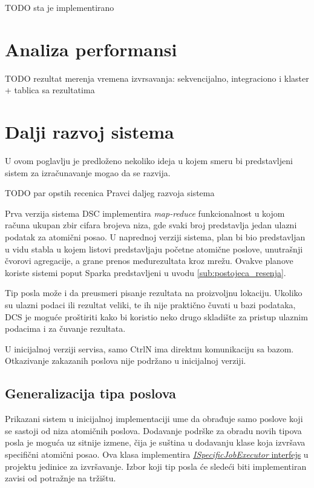 \documentclass[12pt,oneside]{memoir}
\begin{document}
TODO sta je implementirano




\section{Analiza performansi}
TODO rezultat merenja vremena izvrsavanja: sekvencijalno, integraciono i klaster
+ tablica sa rezultatima

\section{Dalji razvoj sistema}

U ovom poglavlju je predloženo nekoliko ideja u kojem smeru bi predstavljeni sistem za izračunavanje mogao da se razvija.

TODO par opstih recenica Pravci daljeg razvoja sistema

Prva verzija sistema DSC implementira \emph{map-reduce} funkcionalnost u kojom računa ukupan zbir cifara brojeva niza, gde svaki broj predstavlja jedan ulazni podatak za atomični posao. U naprednoj verziji sistema, plan bi bio predstavljan u vidu stabla u kojem listovi predstavljaju početne atomične poslove, unutrašnji čvorovi agregacije, a grane prenos međurezultata kroz mrežu. Ovakve planove koriste sistemi poput Sparka \cite{Spark} predstavljeni u uvodu \ref{sub:postojeca_resenja}.

Tip posla može i da preusmeri pisanje rezultata na proizvoljnu lokaciju.
Ukoliko su ulazni podaci ili rezultat veliki, te ih nije praktično čuvati u bazi podataka, DCS je moguće proštiriti kako bi koristio neko drugo skladište za pristup ulaznim podacima i za čuvanje rezultata.

U inicijalnoj verziji servisa, samo CtrlN ima direktnu komunikaciju sa bazom.
Otkazivanje zakazanih poslova nije podržano u inicijalnoj verziji.

\subsection{Generalizacija tipa poslova}

Prikazani sistem u inicijalnoj implementaciji ume da obrađuje samo poslove koji se sastoji od niza atomičnih poslova. Dodavanje podrške za obradu novih tipova posla je moguća uz sitnije izmene, čija je suština u dodavanju klase koja izvršava specifični atomični posao. Ova klasa implementira \href{https://github.com/milana-kovacevic/DistributedComputationSystem/blob/main/src/ComputeNode/Executors/ISpecificJobExecutor.cs}{\emph{ISpecificJobExecutor} interfejs} u projektu jedinice za izvršavanje. Izbor koji tip posla će sledeći biti implementiran zavisi od potražnje na tržištu.
\end{document}
